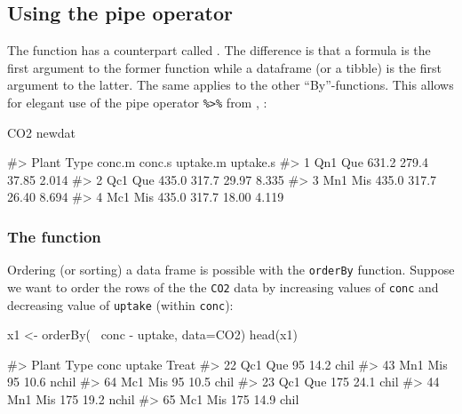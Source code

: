 \hypertarget{using-the-pipe-operator}{%
\subsection{Using the pipe operator}\label{using-the-pipe-operator}}

The  function has a counterpart called
. The difference is that a formula is the first
argument to the former function while a dataframe (or a tibble) is the
first argument to the latter. The same applies to the other
``By''-functions. This allows for elegant use of the pipe operator
\texttt{\%\textgreater{}\%} from , \citep{magrittr}:

\begin{Schunk}
\begin{Sinput}
CO2 %
newdat
\end{Sinput}
\begin{Soutput}
#>   Plant Type conc.m conc.s uptake.m uptake.s
#> 1   Qn1  Que  631.2  279.4    37.85    2.014
#> 2   Qc1  Que  435.0  317.7    29.97    8.335
#> 3   Mn1  Mis  435.0  317.7    26.40    8.694
#> 4   Mc1  Mis  435.0  317.7    18.00    4.119
\end{Soutput}
\end{Schunk}

\hypertarget{the-function-1}{%
\subsubsection{\texorpdfstring{The 
function}{The  function}}\label{the-function-1}}

Ordering (or sorting) a data frame is possible with the \texttt{orderBy}
function. Suppose we want to order the rows of the the \texttt{CO2} data
by increasing values of \texttt{conc} and decreasing value of
\texttt{uptake} (within \texttt{conc}):

\begin{Schunk}
\begin{Sinput}
x1 <- orderBy(~ conc - uptake, data=CO2)
head(x1)
\end{Sinput}
\begin{Soutput}
#>    Plant Type conc uptake Treat
#> 22   Qc1  Que   95   14.2  chil
#> 43   Mn1  Mis   95   10.6 nchil
#> 64   Mc1  Mis   95   10.5  chil
#> 23   Qc1  Que  175   24.1  chil
#> 44   Mn1  Mis  175   19.2 nchil
#> 65   Mc1  Mis  175   14.9  chil
\end{Soutput}
\end{Schunk}

